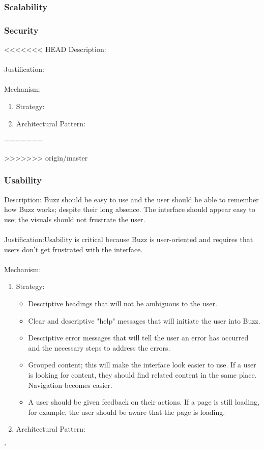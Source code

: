\documentclass[a4paper,12pt,titlepage]{article}
\begin{document}
\subsubsection{Scalability}%
	
\newpage
\subsubsection{Security}%
<<<<<<< HEAD
	Description: \\\\
	Justification: \\\\
	Mechanism:
	\begin{enumerate}
		\item Strategy: 
		\item Architectural Pattern:
	\end{enumerate}
\newpage
=======
	
>>>>>>> origin/master
\subsubsection{Usability}%
	Description: Buzz should be easy to use and the user should be able to remember how Buzz works; despite their long absence. The interface should appear easy to use; the visuals should not frustrate the user.\\\\
	Justification:Usability is critical because Buzz is user-oriented and requires that users don't get frustrated with the interface. \\\\
	Mechanism:
	\begin{enumerate}
		\item Strategy:
		\begin{itemize}
			\item Descriptive headings that will not be ambiguous to the user.
			\item Clear and descriptive "help" messages that will initiate the user into Buzz. 
			\item Descriptive error messages that will tell the user an error has occurred and the necessary steps to address the errors.
			\item Grouped content; this will make the interface look easier to use. If a user is looking for content, they should find related content in the same place. Navigation becomes easier.
			\item A user should be given feedback on their actions. If a page is still loading, for example, the user should be aware that the page is loading.
		\end{itemize} 
		\item Architectural Pattern:
	\end{enumerate}'
\newpage
\end{document}
